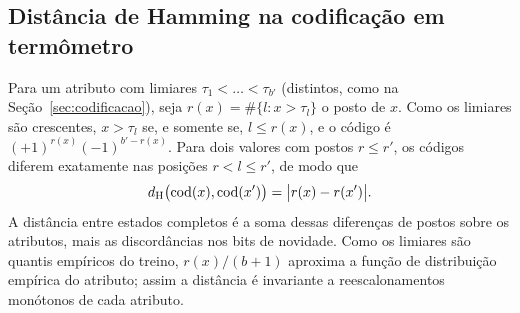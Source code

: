 \subsection{Distância de Hamming na codificação em termômetro}
Para um atributo com limiares $\tau_1<\dots<\tau_{b'}$ (distintos, como na Seção~\ref{sec:codificacao}), seja
$r(x)=\#\{l:x>\tau_l\}$ o posto de $x$. Como os limiares são crescentes, $x>\tau_l$ se, e somente se,
$l\le r(x)$, e o código é $(+1)^{r(x)}(-1)^{b'-r(x)}$. Para dois valores com postos $r\le r'$, os códigos diferem
exatamente nas posições $r<l\le r'$, de modo que
\[
d_{\mathrm{H}}\bigl(\mathrm{cod}(x),\mathrm{cod}(x')\bigr)=\bigl|r(x)-r(x')\bigr| .
\]
A distância entre estados completos é a soma dessas diferenças de postos sobre os atributos, mais as
discordâncias nos bits de novidade. Como os limiares são quantis empíricos do treino, $r(x)/(b+1)$ aproxima a
função de distribuição empírica do atributo; assim a distância é invariante a reescalonamentos monótonos de
cada atributo.
